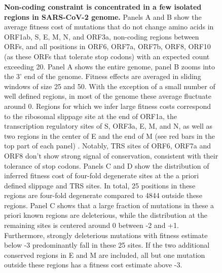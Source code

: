 \documentclass[9pt,twocolumn,twoside]{gsajnl_modified}
\begin{document}
\begin{figure}
\centering
\caption{
{\bf Non-coding constraint is concentrated in a few isolated regions in SARS-CoV-2 genome.}
Panels A and B show the average fitness cost of mutations that do not change amino acids in ORF1ab, S, E, M, N, and ORF3a, non-coding regions between ORFs, and all positions in ORF6, ORF7a, ORF7b, ORF8, ORF10 (as these ORFs that tolerate stop codons) with an expected count exceeding 20.
Panel A shows the entire genome, panel B zooms into the 3' end of the genome.
Fitness effects are averaged in sliding windows of size 25 and 50.
With the exception of a small number of well defined regions, in most of the genome these average fluctuate around 0.
Regions for which we infer large fitness costs correspond to the ribosomal slippage site at the end of ORF1a, the transcription regulatory sites of S, ORF3a, E, M, and N, as well as two regions in the center of E and the end of M (see red bars in the top part of each panel) \citep{markov2023evolution}.
Notably, TRS sites of ORF6, ORF7a and ORF8 don't show strong signal of conservation, consistent with their tolerance of stop codons.
Panels C and D show the distribution of inferred fitness cost of four-fold degenerate sites at the a priori defined slippage and TRS sites.
In total, 25 positions in these regions are four-fold degenerate compared to 4844 outside these regions.
Panel C shows that a large fraction of mutations in these a priori known regions are deleterious, while the distribution at the remaining sites is centered around 0 between -2 and +1.
Furthermore, strongly deleterious mutations with fitness estimate below -3 predominantly fall in these 25 sites.
If the two additional conserved regions in E and M are included, all but one mutation outside these regions has a fitness cost estimate above -3.
\label{fig:synonymous}
}
\end{figure}
\end{document}
